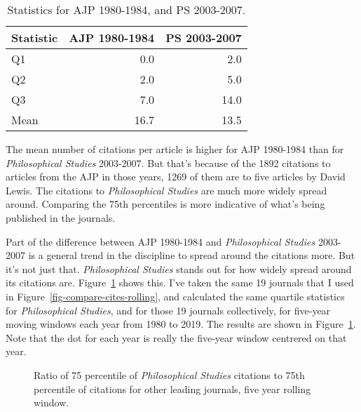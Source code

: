 \documentclass[
  10pt,
  letterpaper,
  DIV=11,
  numbers=noendperiod,
  twoside]{scrartcl}
\begin{document}
\begin{longtable}[]{@{}lrr@{}}

\caption{\label{tbl-quartiles-two-journals}Statistics for AJP 1980-1984,
and PS 2003-2007.}

\tabularnewline

\toprule\noalign{}
Statistic & AJP 1980-1984 & PS 2003-2007 \\
\midrule\noalign{}
\endhead
\bottomrule\noalign{}
\endlastfoot
Q1 & 0.0 & 2.0 \\
Q2 & 2.0 & 5.0 \\
Q3 & 7.0 & 14.0 \\
Mean & 16.7 & 13.5 \\

\end{longtable}

The mean number of citations per article is higher for AJP 1980-1984
than for \emph{Philosophical Studies} 2003-2007. But that's because of
the 1892 citations to articles from the AJP in those years, 1269 of them
are to five articles by David Lewis. The citations to
\emph{Philosophical Studies} are much more widely spread around.
Comparing the 75th percentiles is more indicative of what's being
published in the journals.

Part of the difference between AJP 1980-1984 and \emph{Philosophical
Studies} 2003-2007 is a general trend in the discipline to spread around
the citations more. But it's not just that. \emph{Philosophical Studies}
stands out for how widely spread around its citations are.
Figure~\ref{fig-quartiles-ps-vs-19} shows this. I've taken the same 19
journals that I used in Figure~\ref{fig-compare-cites-rolling}, and
calculated the same quartile statistics for \emph{Philosophical
Studies}, and for those 19 journals collectively, for five-year moving
windows each year from 1980 to 2019. The results are shown in
Figure~\ref{fig-quartiles-ps-vs-19}. Note that the dot for each year is
really the five-year window centrered on that year.

\begin{figure}


\caption{\label{fig-quartiles-ps-vs-19}Ratio of 75 percentile of
\emph{Philosophical Studies} citations to 75th percentile of citations
for other leading journals, five year rolling window.}

\end{figure}%
\end{document}
